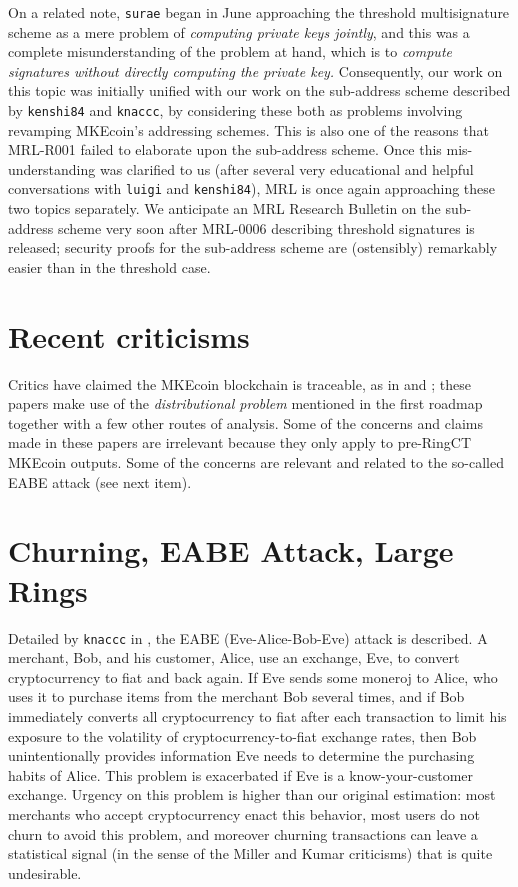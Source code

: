 \documentclass[12pt,english]{mrl}
\theoremstyle{definition}
\numberwithin{equation}{section}
\numberwithin{figure}{section}
\numberwithin{equation}{section}
\numberwithin{equation}{section}
\numberwithin{figure}{section}
\begin{document}
    
On a related note, \texttt{surae} began in June approaching the threshold multisignature scheme as a mere problem of \textit{computing private keys jointly}, and this was a complete misunderstanding of the problem at hand, which is to \textit{compute signatures without directly computing the private key.} Consequently, our work on this topic was initially unified with our work on the sub-address scheme described by \texttt{kenshi84} and \texttt{knaccc}, by considering these both as problems involving revamping MKEcoin's addressing schemes. This is also one of the reasons that MRL-R001 failed to elaborate upon the sub-address scheme. Once this mis-understanding was clarified to us (after several very educational and helpful conversations with \texttt{luigi} and \texttt{kenshi84}), MRL is once again approaching these two topics separately. We anticipate an MRL Research Bulletin on the sub-address scheme very soon after MRL-0006 describing threshold signatures is released; security proofs for the sub-address scheme are (ostensibly) remarkably easier than in the threshold case.
    
\section{Recent criticisms} 

Critics have claimed the MKEcoin blockchain is traceable, as in \cite{miller2017empirical} and \cite{kumar2017traceability}; these papers make use of the \emph{distributional problem} mentioned in the first roadmap together with a few other routes of analysis. Some of the concerns and claims made in these papers are irrelevant because they only apply to pre-RingCT MKEcoin outputs. Some of the concerns are relevant and related to the so-called EABE attack (see next item).
    
    
    
\section{Churning, EABE Attack, Large Rings}

Detailed by \texttt{knaccc} in \cite{knaccc2017}, the EABE (Eve-Alice-Bob-Eve) attack is described. A merchant, Bob, and his customer, Alice, use an exchange, Eve, to convert cryptocurrency to fiat and back again. If Eve sends some moneroj to Alice, who uses it to purchase items from the merchant Bob several times, and if Bob immediately converts all cryptocurrency to fiat after each transaction to limit his exposure to the volatility of cryptocurrency-to-fiat exchange rates, then Bob unintentionally provides information Eve needs to determine the purchasing habits of Alice. This problem is exacerbated if Eve is a know-your-customer exchange. Urgency on this problem is higher than our original estimation: most merchants who accept cryptocurrency enact this behavior, most users do not churn to avoid this problem, and moreover churning transactions can leave a statistical signal (in the sense of the Miller and Kumar criticisms) that is quite undesirable.  
    
\end{document}
